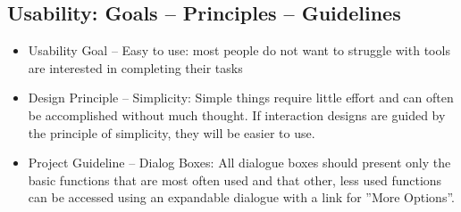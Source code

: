 \subsection{Usability: Goals -- Principles -- Guidelines}
\begin{itemize}
\item Usability Goal -- Easy to use: most people do not want to struggle with tools are interested in completing their tasks
\item Design Principle -- Simplicity: Simple things require little effort and can often be accomplished without much thought. If interaction designs are guided by the principle of simplicity, they will be easier to use.
\item Project Guideline -- Dialog Boxes: All dialogue boxes should present only the basic functions that are most often used and that other, less used functions can be accessed using an expandable dialogue with a link for ''More Options”.
\end{itemize}
